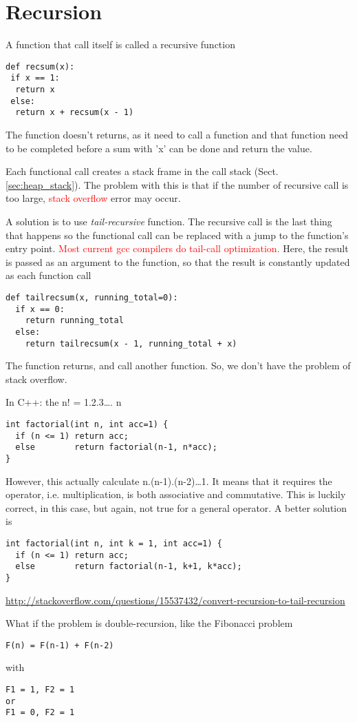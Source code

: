 \section{Recursion}

A function that call itself is called a recursive function
\begin{verbatim}
def recsum(x):
 if x == 1:
  return x
 else:
  return x + recsum(x - 1)
\end{verbatim}
The function doesn't returns, as it need to call a function and that function
need to be completed before a sum with 'x' can be done and return the value.

Each functional call creates a stack frame in the call stack
(Sect.\ref{sec:heap_stack}). The problem with this is that if the number of
recursive call is too large, \textcolor{red}{stack overflow} error may occur.

A solution is to use {\it tail-recursive} function. The recursive call is the
last thing that happens so the functional call can be replaced with a jump to
the function's entry point. \textcolor{red}{Most current gcc compilers do
tail-call optimization.} Here, the result is passed as an argument to the
function, so that the result is constantly updated as each function call
\begin{verbatim}
def tailrecsum(x, running_total=0):
  if x == 0:
    return running_total
  else:
    return tailrecsum(x - 1, running_total + x)
\end{verbatim}
The function returns, and call another function. So, we don't have the problem
of stack overflow.

In C++: the n! = 1.2.3\ldots. n
\begin{verbatim}
int factorial(int n, int acc=1) {
  if (n <= 1) return acc;
  else        return factorial(n-1, n*acc);
}
\end{verbatim}
However, this actually calculate n.(n-1).(n-2)\ldots1. It means that it requires
the operator, i.e. multiplication, is both associative and commutative. This is
luckily correct, in this case, but again, not true for a general operator. A
better solution is
\begin{verbatim}
int factorial(int n, int k = 1, int acc=1) {
  if (n <= 1) return acc;
  else        return factorial(n-1, k+1, k*acc);
}
\end{verbatim}
\url{http://stackoverflow.com/questions/15537432/convert-recursion-to-tail-recursion}

What if the problem is double-recursion, like the Fibonacci problem
\begin{verbatim}
F(n) = F(n-1) + F(n-2)
\end{verbatim}
with
\begin{verbatim}
F1 = 1, F2 = 1
or 
F1 = 0, F2 = 1
\end{verbatim}

